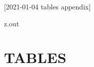 [2021-01-04 tables appendix]

\begin{VerbatimOut}{z.out}
\chapter{TABLES}

\end{VerbatimOut}

\MyIOS


% 
% 
